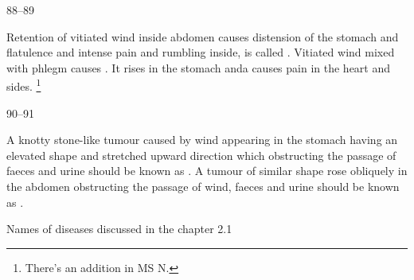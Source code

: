 \begin{translation}
\item[88--89]

	Retention of vitiated wind inside abdomen causes distension of the
	stomach and flatulence and intense pain and rumbling inside, is called
	. Vitiated wind mixed with phlegm causes
	. It rises in the stomach anda causes pain in the heart
	and sides. \footnote{There’s an addition in MS N. }

\item[90--91]

	A knotty stone-like tumour caused by wind appearing in the stomach
	having an elevated shape and stretched upward direction which
	obstructing the passage of faeces and urine should be known as
	. A tumour of similar shape rose obliquely in the abdomen
	obstructing the passage of wind, faeces and urine should be known as
	. 


	Names of diseases discussed in the chapter 2.1

	   
	 
	 
	   




\end{translation}
